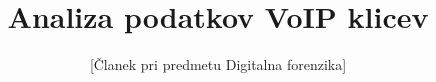 \documentclass{acm_proc_article-sp}
\begin{document}
\title{Analiza podatkov VoIP klicev}
\subtitle{[Članek pri predmetu Digitalna forenzika]
}

%
%
%
%
%
\end{document}
